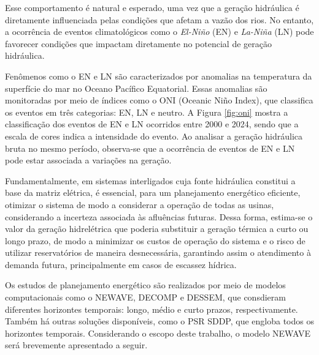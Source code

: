 \begin{figure}[!ht]
	{}
	{}
\end{figure}

Esse comportamento é natural e esperado, uma vez que a geração hidráulica é diretamente influenciada pelas condições
que afetam a vazão dos rios. No entanto, a ocorrência de eventos climatológicos como o \textit{El-Niño} (EN) e 
\textit{La-Niña} (LN) pode favorecer condições que impactam diretamente no potencial de geração hidráulica. \cite{de2012influencia}

Fenômenos como o EN e LN são caracterizados por anomalias na temperatura da superfície do mar no Oceano Pacífico
Equatorial. Essas anomalias são monitoradas por meio de índices como o ONI (Oceanic Niño Index), que classifica os 
eventos em três categorias: EN, LN e neutro. A Figura \ref{fig:oni} mostra a classificação dos eventos de EN e LN 
ocorridos entre 2000 e 2024, sendo que a escala de cores indica a intensidade do evento. Ao analisar a geração 
hidráulica bruta no mesmo período, observa-se que a ocorrência de eventos de EN e LN pode estar associada a variações na geração.

\begin{figure}[!ht]
	{}
	{}
\end{figure}

Fundamentalmente, em sistemas interligados cuja fonte hidráulica constitui a base da matriz elétrica, é essencial, 
para um planejamento energético eficiente, otimizar o sistema de modo a considerar a operação de todas as usinas, 
considerando a incerteza associada às afluências futuras. Dessa forma, estima-se o valor da geração hidrelétrica que 
poderia substituir a geração térmica a curto ou longo prazo, de modo a minimizar os custos de operação do sistema e o 
risco de utilizar reservatórios de maneira desnecessária, garantindo assim o atendimento à demanda futura, 
principalmente em casos de escassez hídrica.

Os estudos de planejamento energético são realizados por meio de modelos computacionais como o NEWAVE, DECOMP e DESSEM, 
que consdieram diferentes horizontes temporais: longo, médio e curto prazos, respectivamente. Também há outras soluções 
disponíveis, como o PSR SDDP, que engloba todos os horizontes temporais. Considerando o escopo deste trabalho, o modelo 
NEWAVE será brevemente apresentado a seguir.

